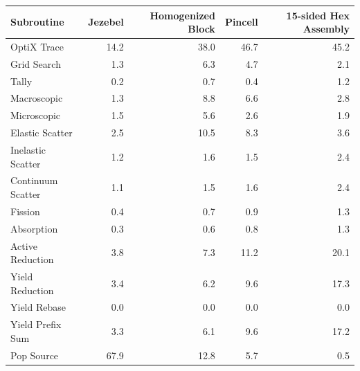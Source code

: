 \begin{table}[h!]
\begin{tabular}{| l | r  | r | r | r |}
 \hline
Subroutine         & Jezebel & Homogenized Block & Pincell & 15-sided Hex Assembly  \\
\hline \hline
 OptiX Trace       & 14.2       &      38.0            &   46.7    &    45.2     \\ \hline
 Grid Search       &  1.3      &        6.3                 &  4.7     &     2.1      \\ \hline
 Tally                   &  0.2      &         0.7               &   0.4    &    1.2       \\ \hline
 Macroscopic      &  1.3     &          8.8               &  6.6      &    2.8     \\ \hline
 Microscopic       &  1.5      &          5.6               &  2.6     &    1.9       \\ \hline
 Elastic Scatter   &  2.5      &        10.5                 &   8.3    &   3.6      \\ \hline
 Inelastic Scatter & 1.2       &        1.6                  &  1.5    &    2.4    \\ \hline
 Continuum Scatter & 1.1  &         1.5                 &   1.6   &    2.4   \\ \hline
 Fission               &  0.4      &         0.7                 &   0.9   &    1.3      \\ \hline
 Absorption          & 0.3       &         0.6                 &   0.8   &    1.3      \\ \hline
Active Reduction  &  3.8      &        7.3                  &   11.2   &  20.1        \\ \hline
 Yield Reduction  &   3.4     &        6.2                 &  9.6    &    17.3     \\ \hline
 Yield Rebase     &    0.0     &       0.0                   &   0.0  &    0.0    \\ \hline
 Yield Prefix Sum &   3.3    &       6.1                    &  9.6   &    17.2    \\ \hline
 Pop Source         &  67.9     &     12.8                    & 5.7    &    0.5    \\ 
\hline
\end{tabular}
\end{table}



